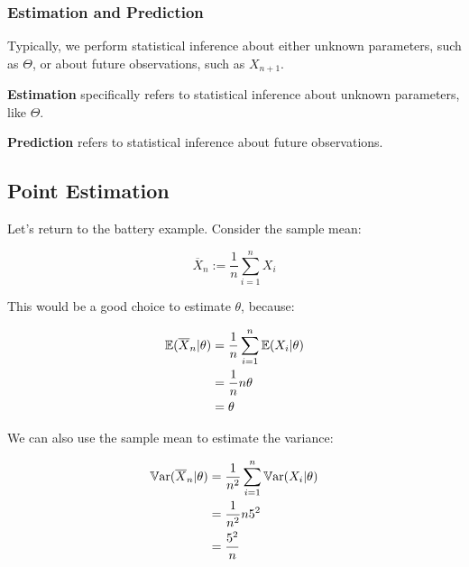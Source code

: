 \documentclass[a4paper]{article}
\begin{document}
            \subsubsection{Estimation and Prediction}
                Typically, we perform statistical inference about either unknown
                parameters, such as $\Theta$, or about future observations, such
                as $X_{n+1}$.

                \begin{definition}
                    \textbf{Estimation} specifically refers to statistical
                    inference about unknown parameters, like $\Theta$.

                    \textbf{Prediction} refers to statistical inference about
                    future observations.
                \end{definition}

        \subsection{Point Estimation}
            \begin{fread}
                [MR03, section 7.2]
            \end{fread}

            Let's return to the battery example. Consider the sample mean:

            \[
                \overline X_n := \frac{1}{n} \sum_{i=1}^n X_i
            \]

            This would be a good choice to estimate $\theta$, because:

            \begin{align*}
                \mathbb{E}(\overline X_n | \theta) & = \frac{1}{n} \sum_{i = 1}^n \mathbb{E}(X_i
                    | \theta) \\
                & = \frac{1}{n}n\theta \\
                & = \theta
            \end{align*}

            We can also use the sample mean to estimate the variance:

            \begin{align*}
                \mathbb{V}\text{ar}(\overline X_n | \theta) & = \frac{1}{n^2} \sum_{i = 1}^n
                    \mathbb{V}\text{ar}(X_i | \theta) \\
                & = \frac{1}{n^2} n 5^2 \\
                & = \frac{5^2}{n}
            \end{align*}
\end{document}

